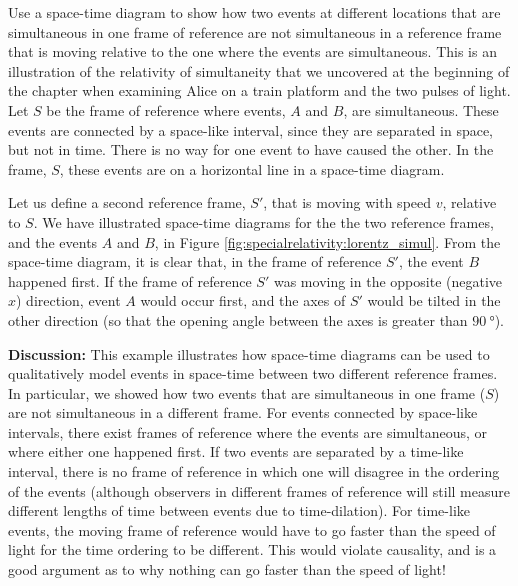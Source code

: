 \begin{example}{Use a space-time diagram to show how two events at different locations that are simultaneous in one frame of reference are not simultaneous in a reference frame that is moving relative to the one where the events are simultaneous. This is an illustration of the relativity of simultaneity that we uncovered at the beginning of the chapter when examining Alice on a train platform and the two pulses of light.}
Let $S$ be the frame of reference where events, $A$ and $B$, are simultaneous. These events are connected by a space-like interval, since they are separated in space, but not in time. There is no way for one event to have caused the other. In the frame, $S$, these events are on a horizontal line in a space-time diagram.

Let us define a second reference frame, $S'$, that is moving with speed $v$, relative to $S$. We have illustrated space-time diagrams for the the two reference frames, and the events $A$ and $B$, in Figure \ref{fig:specialrelativity:lorentz_simul}.
From the space-time diagram, it is clear that, in the frame of reference $S'$, the event $B$ happened first. If the frame of reference $S'$ was moving in the opposite (negative $x$) direction, event $A$ would occur first, and the axes of $S'$ would be tilted in the other direction (so that the opening angle between the axes is greater than $\SI{90}{\degree}$).

\textbf{Discussion: }This example illustrates how space-time diagrams can be used to qualitatively model events in space-time between two different reference frames. In particular, we showed how two events that are simultaneous in one frame ($S$) are not simultaneous in a different frame. For events connected by space-like intervals, there exist frames of reference where the events are simultaneous, or where either one happened first. If two events are separated by a time-like interval, there is no frame of reference in which one will disagree in the ordering of the events (although observers in different frames of reference will still measure different lengths of time between events due to time-dilation). For time-like events, the moving frame of reference would have to go faster than the speed of light for the time ordering to be different. This would violate causality, and is a good argument as to why nothing can go faster than the speed of light!
\end{example}

